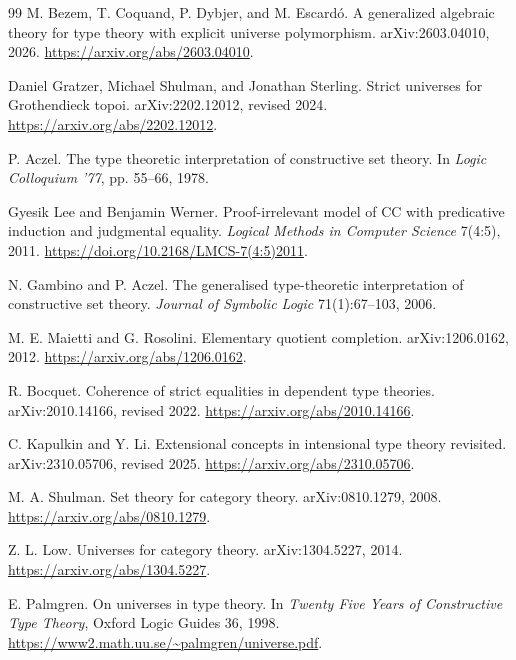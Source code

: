 \documentclass[11pt]{article}
\theoremstyle{definition}
\theoremstyle{remark}
\begin{document}
\begin{thebibliography}{99}
M. Bezem, T. Coquand, P. Dybjer, and M. Escard\'o.
\newblock A generalized algebraic theory for type theory with explicit
  universe polymorphism.
\newblock arXiv:2603.04010, 2026.
\newblock \url{https://arxiv.org/abs/2603.04010}.

Daniel Gratzer, Michael Shulman, and Jonathan Sterling.
\newblock Strict universes for Grothendieck topoi.
\newblock arXiv:2202.12012, revised 2024.
\newblock \url{https://arxiv.org/abs/2202.12012}.

P. Aczel.
\newblock The type theoretic interpretation of constructive set theory.
\newblock In \emph{Logic Colloquium '77}, pp. 55--66, 1978.

Gyesik Lee and Benjamin Werner.
\newblock Proof-irrelevant model of CC with predicative induction and
  judgmental equality.
\newblock \emph{Logical Methods in Computer Science} 7(4:5), 2011.
\newblock \url{https://doi.org/10.2168/LMCS-7(4:5)2011}.

N. Gambino and P. Aczel.
\newblock The generalised type-theoretic interpretation of constructive set
  theory.
\newblock \emph{Journal of Symbolic Logic} 71(1):67--103, 2006.

M. E. Maietti and G. Rosolini.
\newblock Elementary quotient completion.
\newblock arXiv:1206.0162, 2012.
\newblock \url{https://arxiv.org/abs/1206.0162}.

R. Bocquet.
\newblock Coherence of strict equalities in dependent type theories.
\newblock arXiv:2010.14166, revised 2022.
\newblock \url{https://arxiv.org/abs/2010.14166}.

C. Kapulkin and Y. Li.
\newblock Extensional concepts in intensional type theory revisited.
\newblock arXiv:2310.05706, revised 2025.
\newblock \url{https://arxiv.org/abs/2310.05706}.

M. A. Shulman.
\newblock Set theory for category theory.
\newblock arXiv:0810.1279, 2008.
\newblock \url{https://arxiv.org/abs/0810.1279}.

Z. L. Low.
\newblock Universes for category theory.
\newblock arXiv:1304.5227, 2014.
\newblock \url{https://arxiv.org/abs/1304.5227}.

E. Palmgren.
\newblock On universes in type theory.
\newblock In \emph{Twenty Five Years of Constructive Type Theory},
  Oxford Logic Guides 36, 1998.
\newblock \url{https://www2.math.uu.se/~palmgren/universe.pdf}.


\end{thebibliography}
\end{document}
